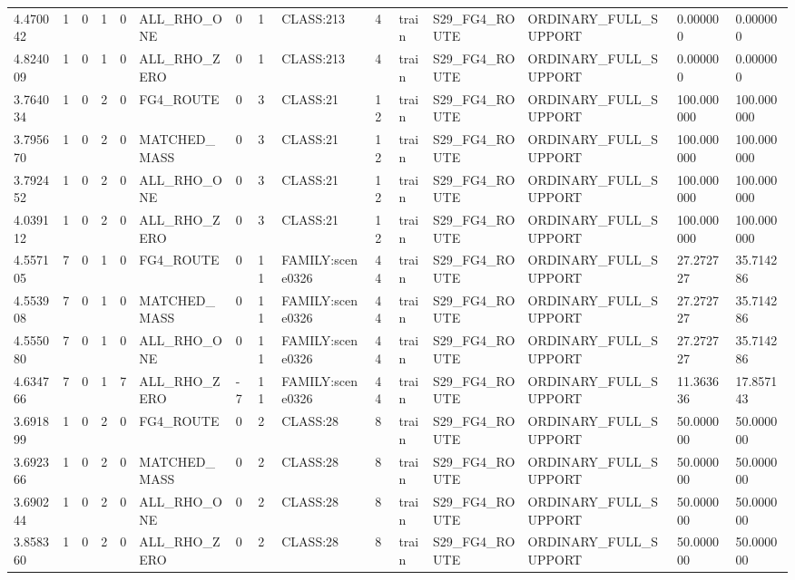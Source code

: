 \begin{tabular}{lllllllllllllll}
4.470042 & 1 & 0 & 1 & 0 & ALL\_RHO\_ONE & 0 & 1 & CLASS:213 & 4 & train & S29\_FG4\_ROUTE & ORDINARY\_FULL\_SUPPORT & 0.000000 & 0.000000 \\
4.824009 & 1 & 0 & 1 & 0 & ALL\_RHO\_ZERO & 0 & 1 & CLASS:213 & 4 & train & S29\_FG4\_ROUTE & ORDINARY\_FULL\_SUPPORT & 0.000000 & 0.000000 \\
3.764034 & 1 & 0 & 2 & 0 & FG4\_ROUTE & 0 & 3 & CLASS:21 & 12 & train & S29\_FG4\_ROUTE & ORDINARY\_FULL\_SUPPORT & 100.000000 & 100.000000 \\
3.795670 & 1 & 0 & 2 & 0 & MATCHED\_MASS & 0 & 3 & CLASS:21 & 12 & train & S29\_FG4\_ROUTE & ORDINARY\_FULL\_SUPPORT & 100.000000 & 100.000000 \\
3.792452 & 1 & 0 & 2 & 0 & ALL\_RHO\_ONE & 0 & 3 & CLASS:21 & 12 & train & S29\_FG4\_ROUTE & ORDINARY\_FULL\_SUPPORT & 100.000000 & 100.000000 \\
4.039112 & 1 & 0 & 2 & 0 & ALL\_RHO\_ZERO & 0 & 3 & CLASS:21 & 12 & train & S29\_FG4\_ROUTE & ORDINARY\_FULL\_SUPPORT & 100.000000 & 100.000000 \\
4.557105 & 7 & 0 & 1 & 0 & FG4\_ROUTE & 0 & 11 & FAMILY:scene0326 & 44 & train & S29\_FG4\_ROUTE & ORDINARY\_FULL\_SUPPORT & 27.272727 & 35.714286 \\
4.553908 & 7 & 0 & 1 & 0 & MATCHED\_MASS & 0 & 11 & FAMILY:scene0326 & 44 & train & S29\_FG4\_ROUTE & ORDINARY\_FULL\_SUPPORT & 27.272727 & 35.714286 \\
4.555080 & 7 & 0 & 1 & 0 & ALL\_RHO\_ONE & 0 & 11 & FAMILY:scene0326 & 44 & train & S29\_FG4\_ROUTE & ORDINARY\_FULL\_SUPPORT & 27.272727 & 35.714286 \\
4.634766 & 7 & 0 & 1 & 7 & ALL\_RHO\_ZERO & -7 & 11 & FAMILY:scene0326 & 44 & train & S29\_FG4\_ROUTE & ORDINARY\_FULL\_SUPPORT & 11.363636 & 17.857143 \\
3.691899 & 1 & 0 & 2 & 0 & FG4\_ROUTE & 0 & 2 & CLASS:28 & 8 & train & S29\_FG4\_ROUTE & ORDINARY\_FULL\_SUPPORT & 50.000000 & 50.000000 \\
3.692366 & 1 & 0 & 2 & 0 & MATCHED\_MASS & 0 & 2 & CLASS:28 & 8 & train & S29\_FG4\_ROUTE & ORDINARY\_FULL\_SUPPORT & 50.000000 & 50.000000 \\
3.690244 & 1 & 0 & 2 & 0 & ALL\_RHO\_ONE & 0 & 2 & CLASS:28 & 8 & train & S29\_FG4\_ROUTE & ORDINARY\_FULL\_SUPPORT & 50.000000 & 50.000000 \\
3.858360 & 1 & 0 & 2 & 0 & ALL\_RHO\_ZERO & 0 & 2 & CLASS:28 & 8 & train & S29\_FG4\_ROUTE & ORDINARY\_FULL\_SUPPORT & 50.000000 & 50.000000 \\

\end{tabular}
